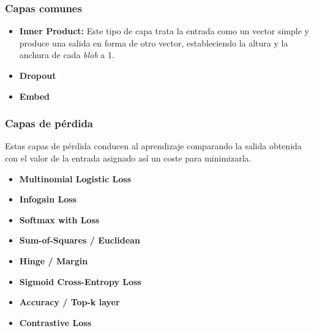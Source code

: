 \documentclass[a4paper, 12pt, oneside]{book}
\begin{document}
\begin{comment}
\subsubsection{Capas recurrentes}

\begin{itemize}
\item \textbf{Recurrent}
\item \textbf{RRNN}
\item \textbf{Long-Short Term Memory (LSTM)}
\end{itemize}
\end{comment}

\subsubsection{Capas comunes}

\begin{itemize}
\item \textbf{Inner Product:} Este tipo de capa trata la entrada como un vector simple y produce una salida en forma de otro vector, estableciendo la altura y la anchura de cada \textit{blob} a 1.
\item \textbf{Dropout}
\item \textbf{Embed}
\end{itemize}

\subsubsection{Capas de pérdida}

Estas capas de pérdida conducen al aprendizaje comparando la salida obtenida con el valor de la entrada asignado así un coste para minimizarla.

\begin{itemize}
\item \textbf{Multinomial Logistic Loss}
\item \textbf{Infogain Loss}
\item \textbf{Softmax with Loss}
\item \textbf{Sum-of-Squares / Euclidean}
\item \textbf{Hinge / Margin}
\item \textbf{Sigmoid Cross-Entropy Loss}
\item \textbf{Accuracy / Top-k layer}
\item \textbf{Contrastive Loss}
\end{itemize}
\end{document}
